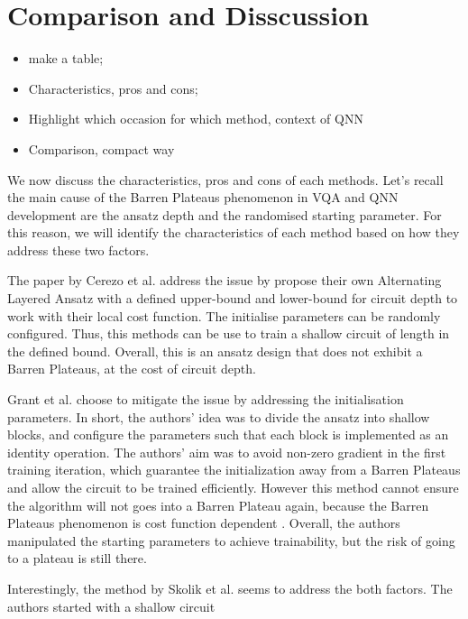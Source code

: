 \section{Comparison and Disscussion}
\begin{itemize}
    \item make a table;
    \item Characteristics, pros and cons;
    \item Highlight which occasion for which method, context of QNN
    \item Comparison, compact way
\end{itemize}

We now discuss the characteristics, pros and cons of each methods.
Let's recall the main cause of the Barren Plateaus phenomenon in VQA and QNN development are the ansatz depth and the randomised starting parameter.
For this reason, we will identify the characteristics of each method based on how they address these two factors.

The paper \cite{cerezoCostFunctionDependent2021} by Cerezo et al. address the issue by propose their own Alternating Layered Ansatz with a defined upper-bound and lower-bound for circuit depth to work with their local cost function. 
The initialise parameters can be randomly configured.
Thus, this methods can be use to train a shallow circuit of length in the defined bound. 
Overall, this is an ansatz design that does not exhibit a Barren Plateaus, at the cost of circuit depth.

Grant et al. \cite{grantInitializationStrategyAddressing2019} choose to mitigate the issue by addressing the initialisation parameters. 
In short, the authors' idea was to divide the ansatz into shallow blocks, and configure the parameters such that each block is implemented as an identity operation.
The authors' aim was to avoid non-zero gradient in the first training iteration, which guarantee the initialization away from a Barren Plateaus and allow the circuit to be trained efficiently.
However this method cannot ensure the algorithm will not goes into a Barren Plateau again, because the Barren Plateaus phenomenon is cost function dependent \cite{cerezoCostFunctionDependent2021}.
Overall, the authors manipulated the starting parameters to achieve trainability, but the risk of going to a plateau is still there.

Interestingly, the method by Skolik et al. \cite{skolikLayerwiseLearningQuantum2021} seems to address the both factors.
The authors started with a shallow circuit